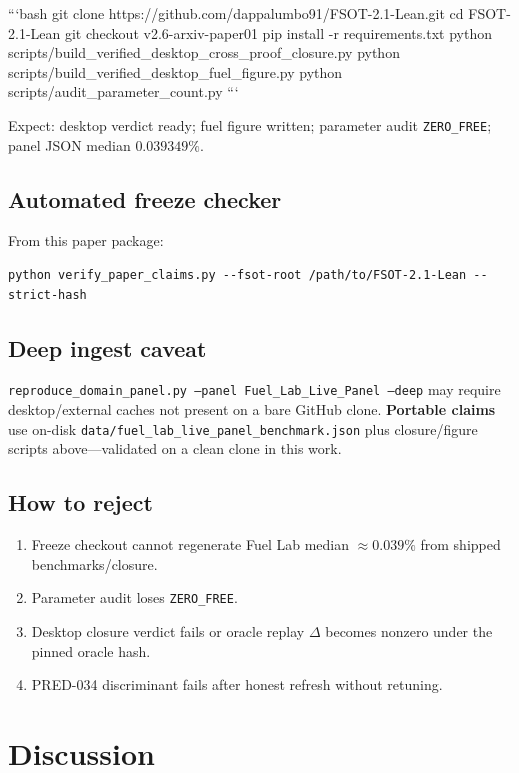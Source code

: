 \documentclass[11pt,a4paper]{article}
\begin{document}
```bash
git clone https://github.com/dappalumbo91/FSOT-2.1-Lean.git
cd FSOT-2.1-Lean
git checkout v2.6-arxiv-paper01
pip install -r requirements.txt
python scripts/build_verified_desktop_cross_proof_closure.py
python scripts/build_verified_desktop_fuel_figure.py
python scripts/audit_parameter_count.py
```

Expect: desktop verdict ready; fuel figure written; parameter audit
\texttt{ZERO\_FREE}; panel JSON median $0.039349\%$.

\subsection{Automated freeze checker}

From this paper package:
\begin{verbatim}
python verify_paper_claims.py --fsot-root /path/to/FSOT-2.1-Lean --strict-hash
\end{verbatim}

\subsection{Deep ingest caveat}

\texttt{reproduce\_domain\_panel.py --panel Fuel\_Lab\_Live\_Panel --deep}
may require desktop/external caches not present on a bare GitHub clone.
\textbf{Portable claims} use on-disk
\texttt{data/fuel\_lab\_live\_panel\_benchmark.json} plus closure/figure
scripts above---validated on a clean clone in this work.

\subsection{How to reject}

\begin{enumerate}[leftmargin=*]
\item Freeze checkout cannot regenerate Fuel Lab median $\approx 0.039\%$ from
      shipped benchmarks/closure.
\item Parameter audit loses \texttt{ZERO\_FREE}.
\item Desktop closure verdict fails or oracle replay $\Delta$ becomes nonzero
      under the pinned oracle hash.
\item PRED-034 discriminant fails after honest refresh without retuning.
\end{enumerate}

\section{Discussion}
\label{sec:disc}
\end{document}
